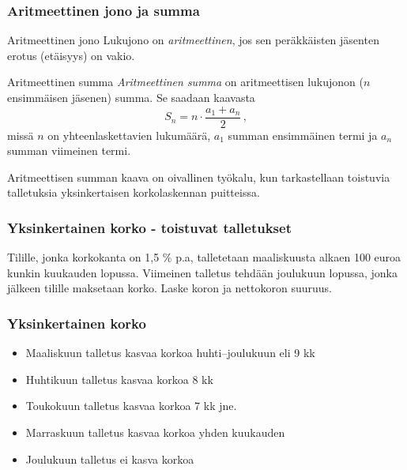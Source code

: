 \documentclass[]{beamer}
\begin{document}
\begin{frame}
    \frametitle{Aritmeettinen jono ja summa}
    \begin{block}{Aritmeettinen jono}
        Lukujono \pause on \emph{aritmeettinen}, jos sen peräkkäisten jäsenten erotus (etäisyys) on vakio.
    \end{block}
    \pause
    \begin{block}{Aritmeettinen summa}
        \emph{Aritmeettinen summa} \pause on aritmeettisen lukujonon ($n$ ensimmäisen jäsenen) summa. \pause Se saadaan kaavasta
        \[
            S_n = n \cdot \frac{a_1 + a_n}{2}\,,
        \]
        \pause missä $n$ on yhteenlaskettavien lukumäärä, \pause $a_1$ summan ensimmäinen termi ja \pause $a_n$ summan viimeinen termi.
    \end{block}
    \pause
    Aritmeettisen summan kaava on oivallinen työkalu, kun tarkastellaan toistuvia talletuksia yksinkertaisen korkolaskennan puitteissa.
\end{frame}

\begin{frame}
    \frametitle{Yksinkertainen korko - toistuvat talletukset}
    \begin{esim}
        Tilille, jonka korkokanta on 1,5 \% p.a, talletetaan maaliskuusta alkaen 100 euroa kunkin kuukauden lopussa.
        Viimeinen talletus tehdään joulukuun lopussa, jonka jälkeen tilille maksetaan korko. Laske koron ja nettokoron suuruus.
    \end{esim}
\end{frame}

\begin{frame}
    \frametitle{Yksinkertainen korko}
	\begin{ratkaisu}
		\begin{itemize}
			\item Maaliskuun talletus kasvaa korkoa huhti--joulukuun eli 9 kk
			\item Huhtikuun talletus kasvaa korkoa 8 kk
			\item Toukokuun talletus kasvaa korkoa 7 kk jne.
			\item Marraskuun talletus kasvaa korkoa yhden kuukauden
			\item Joulukuun talletus ei kasva korkoa
		\end{itemize}
	\end{ratkaisu}
\end{frame}
\end{document}
